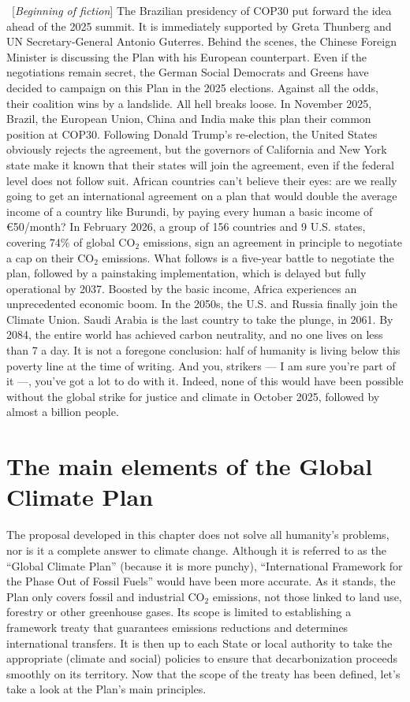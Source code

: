 \documentclass[a5paper,english,openany]{memoir}
\begin{document}
~[\textit{Beginning of fiction}] The Brazilian presidency of COP30 put forward the idea ahead of the 2025 summit. It is immediately supported by Greta Thunberg and UN Secretary-General Antonio Guterres. 
Behind the scenes, the Chinese Foreign Minister is discussing the Plan with his European counterpart.  
Even if the negotiations remain secret, the German Social Democrats and Greens have decided to campaign on this Plan in the 2025 elections. 
Against all the odds, their coalition wins by a landslide. 
All hell breaks loose. In November 2025, Brazil, the European Union, China and India make this plan their common position at COP30. Following Donald Trump's re-election, the United States obviously rejects the agreement, but the governors of California and New York state make it known that their states will join the agreement, even if the federal level does not follow suit. African countries can't believe their eyes: 
are we really going to get an international agreement %
on a plan that would double the average income of a country like Burundi, by paying every human a basic income of \euro{}50/month? In February 2026, a group of 156 countries and 9 U.S. states, covering 74\% of global CO$_\text{2}$ emissions, sign an agreement in principle to negotiate a cap on their CO$_\text{2}$ emissions. What follows is a five-year battle to negotiate the plan, followed by a painstaking implementation, which is delayed but fully operational by 2037. Boosted by the basic income, Africa experiences an unprecedented economic boom. In the 2050s, the U.S. and Russia finally join the Climate Union. Saudi Arabia is the last country to take the plunge, in 2061. By 2084, the entire world has achieved carbon neutrality, and no one lives on less than \textit{\texteuro{}}7 a day. It is not a foregone conclusion: half of humanity is living below this poverty line at the time of writing. %
And you, strikers --- I am sure you're part of it ---, you've got a lot to do with it. Indeed, none of this would have been possible without the global strike for justice and climate in October 2025, followed by almost a billion people.

\chapter{The main elements of the Global Climate Plan\label{ch:principes}}

The proposal developed in this chapter does not solve all humanity's problems, nor is it a complete answer to climate change. Although it is referred to as the ``Global Climate Plan'' (because it is more punchy), ``International Framework for the Phase Out of Fossil Fuels'' would have been more accurate.  %
As it stands, the Plan only covers fossil and industrial CO$_\text{2}$ emissions, not those linked to land use, forestry or other greenhouse gases. %
Its scope is limited to establishing a framework treaty that guarantees emissions reductions and determines international transfers. It is then up to each State or local authority to take the appropriate (climate and social) policies to ensure that decarbonization proceeds smoothly on its territory. Now that the scope of the treaty has been defined, %
let's take a look at the Plan's main principles.
\end{document}
